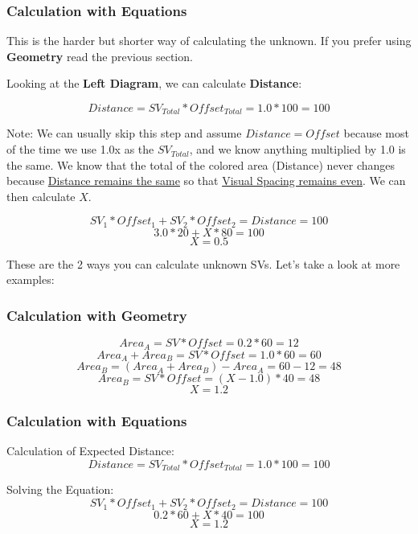 \subsubsection{Calculation with Equations}

This is the harder but shorter way of calculating the unknown. If you prefer using \textbf{Geometry} read the previous section.

Looking at the \textbf{Left Diagram}, we can calculate \textbf{Distance}:

\[ Distance = SV_{Total} * Offset_{Total} = 1.0 * 100 = 100 \]

Note: We can usually skip this step and assume $Distance = Offset$ because most of the time we use 1.0x as the $SV_{Total}$, and we know anything multiplied by 1.0 is the same.\newline
We know that the total of the colored area (Distance) never changes because \underline{Distance remains the same} so that \underline{Visual Spacing remains even}. We can then calculate $X$.

\[ SV_1 * Offset_1 + SV_2 * Offset_2 = Distance = 100\]
\[ 3.0 * 20 + X * 80 = 100\]
\[ X = 0.5\]

These are the 2 ways you can calculate unknown SVs.
Let's take a look at more examples: \newpage





\subsubsection{Calculation with Geometry}

\[ Area_A = SV * Offset = 0.2 * 60 = 12 \]
\[ Area_A + Area_B = SV * Offset = 1.0 * 60 = 60 \]
\[ Area_B = (Area_A + Area_B) - Area_A = 60 - 12 = 48 \]
\[ Area_B = SV * Offset = (X - 1.0) * 40 = 48 \]
\[ X = 1.2 \]

\subsubsection{Calculation with Equations}

Calculation of Expected Distance:
\[ Distance = SV_{Total} * Offset_{Total} = 1.0 * 100 = 100 \]

Solving the Equation:
\[ SV_1 * Offset_1 + SV_2 * Offset_2 = Distance = 100\]
\[ 0.2 * 60 + X * 40 = 100\]
\[ X = 1.2\]
\newpage



